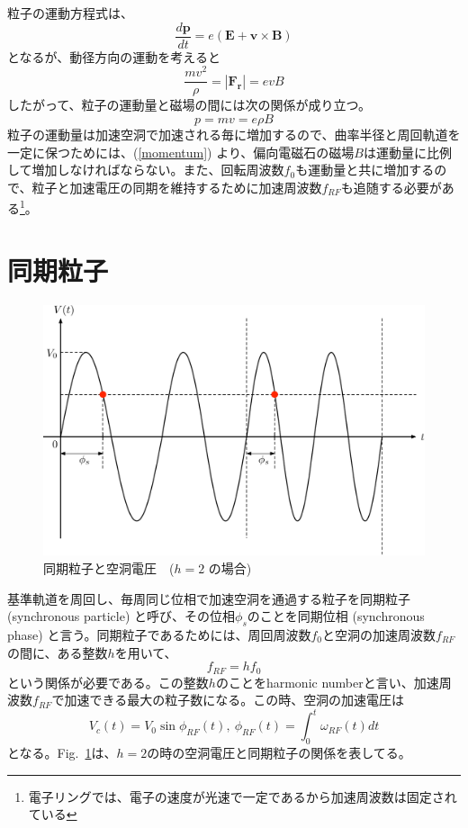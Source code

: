 \documentclass[10pt,a4paper]{ltjsarticle}
\begin{document}
粒子の運動方程式は、
%
\begin{equation}
  \frac{d\bm{p}}{dt} = e (\bm{E} + \bm{v}\times \bm{B})
\end{equation}
%
となるが、動径方向の運動を考えると
%
\begin{equation}
  \frac{m v^2}{\rho} = |\bm{F_r}| = e v B
\end{equation}
%
したがって、粒子の運動量と磁場の間には次の関係が成り立つ。
%
\begin{equation}
  p = mv = e \rho B
  \label{momentum}
\end{equation}
%
粒子の運動量は加速空洞で加速される毎に増加するので、曲率半径と周回軌道を一定に保つためには、(\ref{momentum}) より、偏向電磁石の磁場$B$は運動量に比例して増加しなければならない。また、回転周波数$f_0$も運動量と共に増加するので、粒子と加速電圧の同期を維持するために加速周波数$f_{RF}$も追随する必要がある\footnote{電子リングでは、電子の速度が光速で一定であるから加速周波数は固定されている}。

\section{同期粒子}
\begin{figure}[hbt]
  \begin{center}
    \includegraphics[width=15cm,clip]{synchronous.pdf}
    \caption{同期粒子と空洞電圧　($h=2$ の場合)}
    \label{synchronous}
  \end{center}
\end{figure}

基準軌道を周回し、毎周同じ位相で加速空洞を通過する粒子を同期粒子 (synchronous particle) と呼び、その位相$\phi_s$のことを同期位相 (synchronous phase) と言う。同期粒子であるためには、周回周波数$f_0$と空洞の加速周波数$f_{RF}$の間に、ある整数$h$を用いて、
%
\begin{equation}
  f_{RF} = h f_0
  \label{harmonic}
\end{equation}
%
という関係が必要である。この整数$h$のことをharmonic numberと言い、加速周波数$f_{RF}$で加速できる最大の粒子数になる。この時、空洞の加速電圧は
%
\begin{equation}
  V_c (t) = V_0 \sin \phi_{RF}(t),\:\phi_{RF}(t) = \int_0^t \omega_{RF}(t) dt
\end{equation}
%
となる。Fig.~\ref{synchronous}は、$h=2$の時の空洞電圧と同期粒子の関係を表してる。
\end{document}
